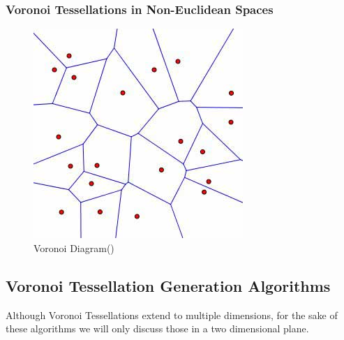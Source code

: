 \subsubsection{Voronoi Tessellations in Non-Euclidean Spaces}\label{tes:ssec:warp}
%
\begin{figure}[H]
    \centering
    \includegraphics[scale=0.65]{Images/voronoi.jpg}
    \caption{Voronoi Diagram(\cite{voronoipic})}
    \label{tes:fig:voreg}
\end{figure}
\subsection{Voronoi Tessellation Generation Algorithms}\label{tes:sec:tga}
Although Voronoi Tessellations extend to multiple dimensions, for the sake of these algorithms we will only discuss those in a two dimensional plane.
%
